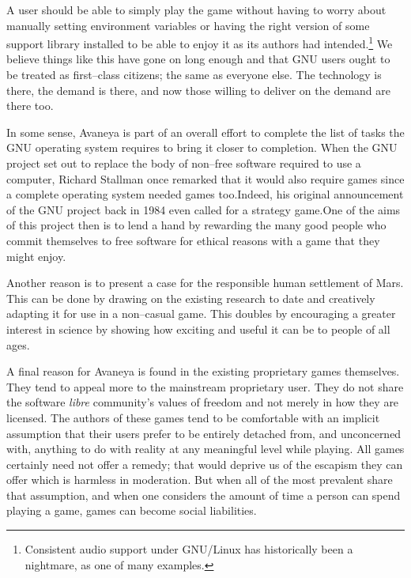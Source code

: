 A user should be able to simply play the game without having to worry about manually setting environment variables or having the right version of some support library installed to be able to enjoy it as its authors had intended.\footnote{Consistent audio support under GNU/Linux has historically been a nightmare, as one of many examples.} We believe things like this have gone on long enough and that GNU users ought to be treated as first--class citizens; the same as everyone else. The technology is there, the demand is there, and now those willing to deliver on the demand are there too.
    {}

In some sense, Avaneya is part of an overall effort to complete the list of tasks the GNU operating system requires to bring it closer to completion. When the GNU project set out to replace the body of non--free software required to use a computer, Richard Stallman once remarked that it would also require games since a complete operating system needed games too.  Indeed, his original announcement of the GNU project back in 1984 even called for a strategy game. One of the aims of this project then is to lend a hand by rewarding the many good people who commit themselves to free software for ethical reasons with a game that they might enjoy.

Another reason is to present a case for the responsible human settlement of Mars. This can be done by drawing on the existing research to date and creatively adapting it for use in a non--casual game. This doubles by encouraging a greater interest in science by showing how exciting and useful it can be to people of all ages.

A final reason for Avaneya is found in the existing proprietary games themselves. They tend to appeal more to the mainstream proprietary user. They do not share the software {\it libre} community's values of freedom and not merely in how they are licensed. The authors of these games tend to be comfortable with an implicit assumption that their users prefer to be entirely detached from, and unconcerned with, anything to do with reality at any meaningful level while playing. All games certainly need not offer a remedy; that would deprive us of the escapism they can offer which is harmless in moderation. But when all of the most prevalent share that assumption, and when one considers the amount of time a person can spend playing a game, games can become social liabilities.

